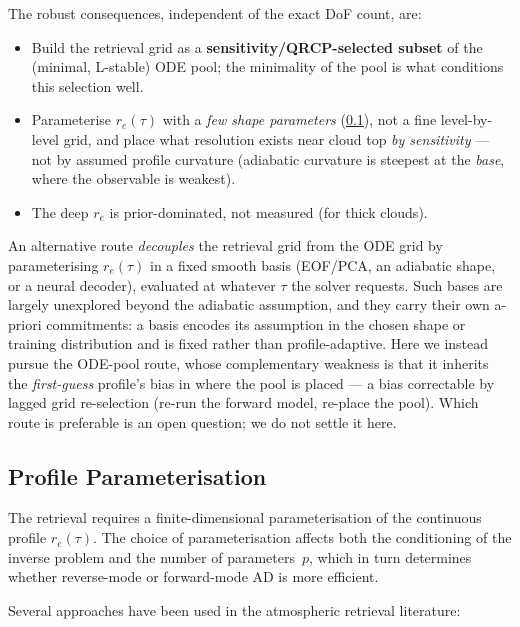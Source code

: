 \documentclass[11pt,a4paper]{article}
\theoremstyle{definition}
\begin{document}
The robust consequences, independent of the exact DoF count, are:
\begin{itemize}[nosep]
  \item Build the retrieval grid as a \textbf{sensitivity/QRCP-selected
    subset} of the (minimal, L-stable) ODE pool; the minimality of the
    pool is what conditions this selection well.
  \item Parameterise $r_e(\tau)$ with a \emph{few shape parameters}
    (\cref{sec:parameterisation}), not a fine level-by-level grid, and
    place what resolution exists near cloud top \emph{by sensitivity} ---
    not by assumed profile curvature (adiabatic curvature is steepest at
    the \emph{base}, where the observable is weakest).
  \item The deep $r_e$ is prior-dominated, not measured (for thick
    clouds).
\end{itemize}

An alternative route \emph{decouples} the retrieval grid from the ODE
grid by parameterising $r_e(\tau)$ in a fixed smooth basis (EOF/PCA, an
adiabatic shape, or a neural decoder), evaluated at whatever $\tau$ the
solver requests.  Such bases are largely unexplored beyond the adiabatic
assumption, and they carry their own a-priori commitments: a basis
encodes its assumption in the chosen shape or training distribution and
is fixed rather than profile-adaptive.  Here we instead pursue the
ODE-pool route, whose complementary weakness is that it inherits the
\emph{first-guess} profile's bias in where the pool is placed --- a bias
correctable by lagged grid re-selection (re-run the forward model,
re-place the pool).  Which route is preferable is an open question; we do
not settle it here.

\subsection{Profile Parameterisation}\label{sec:parameterisation}

The retrieval requires a finite-dimensional parameterisation of the
continuous profile $r_e(\tau)$.  The choice of parameterisation affects
both the conditioning of the inverse problem and the number of
parameters~$p$, which in turn determines whether reverse-mode or
forward-mode AD is more efficient.

Several approaches have been used in the atmospheric retrieval
literature:
\end{document}
